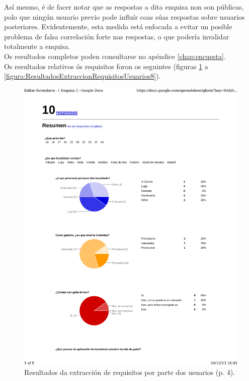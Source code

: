   Así mesmo, é de facer notar que as respostas a dita enquisa non son públicas,
  polo que ningún usuario previo pode influír coas súas respostas sobre
  usuarios posteriores. Evidentemente, esta medida está enfocada a evitar un
  posible problema de falsa correlación forte nas respostas, o que podería
  invalidar totalmente a enquisa. \\

  Os resultados completos poden consultarse no apéndice \ref{chap:encuesta}. \\

  Os resultados relativos ós requisitos foron os seguintes (figuras
  \ref{figura:ResultadosExtraccionRequisitosUsuarios4} a \ref{figura:ResultadosExtraccionRequisitosUsuarios8}). \\

  \begin{figure}[!htbp]
   \centering
   \includegraphics[scale=0.7,page=4,keepaspectratio=true]{./imagenes/enquisa.pdf}
   \caption{Resultados da extracción de requisitos por parte dos usuarios (p. 4).}
   \label{figura:ResultadosExtraccionRequisitosUsuarios4}
  \end{figure}


